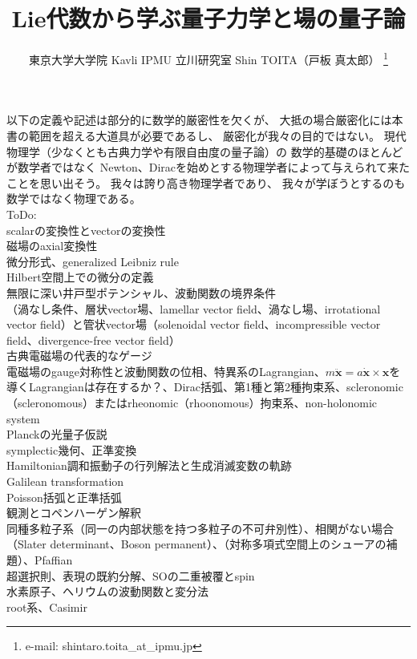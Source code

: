 \documentclass[dvipdfmx, uplatex]{jsarticle}
\title{Lie代数から学ぶ量子力学と場の量子論}
\author{東京大学大学院 Kavli IPMU 立川研究室 \hspace{15pt}Shin TOITA（戸板 真太郎）
\thanks{e-mail: shintaro.toita\_at\_ipmu.jp}}
\begin{document}
\maketitle
\vspace{-4zh}

\tableofcontents
\newpage

以下の定義や記述は部分的に数学的厳密性を欠くが、
大抵の場合厳密化には本書の範囲を超える大道具が必要であるし、
厳密化が我々の目的ではない。
現代物理学（少なくとも古典力学や有限自由度の量子論）の
数学的基礎のほとんどが数学者ではなく
Newton、Diracを始めとする物理学者によって与えられて来たことを思い出そう。
我々は誇り高き物理学者であり、
我々が学ぼうとするのも数学ではなく物理である。
\\

ToDo:
\\scalarの変換性とvectorの変換性
\\磁場のaxial変換性
\\微分形式、generalized Leibniz rule
\\Hilbert空間上での微分の定義
\\無限に深い井戸型ポテンシャル、波動関数の境界条件
\\（渦なし条件、層状vector場、lamellar vector field、渦なし場、irrotational vector field）と管状vector場（solenoidal vector field、incompressible vector field、divergence-free vector field）
\\古典電磁場の代表的なゲージ
\\電磁場のgauge対称性と波動関数の位相、特異系のLagrangian、$m\ddot{\bm{x}} = a\dot{\bm{x}}\times\bm{x}$を導くLagrangianは存在するか？、Dirac括弧、第1種と第2種拘束系、scleronomic（scleronomous）またはrheonomic（rhoonomous）拘束系、non-holonomic system
\\Planckの光量子仮説 
\\symplectic幾何、正準変換
\\Hamiltonian調和振動子の行列解法と生成消滅変数の軌跡
\\Galilean transformation 
\\Poisson括弧と正準括弧
\\観測とコペンハーゲン解釈
\\同種多粒子系（同一の内部状態を持つ多粒子の不可弁別性）、相関がない場合（Slater determinant、Boson permanent）、（対称多項式空間上のシューアの補題）、Pfaffian
\\超選択則、表現の既約分解、SOの二重被覆とspin
\\水素原子、ヘリウムの波動関数と変分法
\\root系、Casimir
\end{document}
